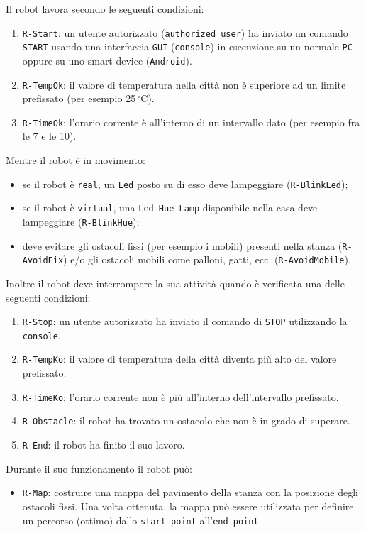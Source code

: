 \documentclass{llncs}
\newcommand{\action}[1]{\texttt{#1}\xspace}
\newcommand{\code}[1]{{\color{blue}\small{\texttt{#1}}}}
\newcommand{\fname}[1]{\small{\color{magenta}\texttt{#1}}}
\begin{document}
Il robot lavora secondo le seguenti condizioni:
\begin{enumerate}
\item \code{R-Start}: un utente autorizzato (\code{authorized user}) ha inviato un comando \action{START} usando una interfaccia \action{GUI} (\code{console}) in esecuzione su un normale \action{PC} oppure su uno smart device (\action{Android}).
\item \code{R-TempOk}: il valore di temperatura nella città non è superiore ad un limite prefissato (per esempio 25\,$^{\circ}$C).
\item \code{R-TimeOk}: l'orario corrente è all'interno di un intervallo dato (per esempio fra le 7 e le 10).
\end{enumerate}

Mentre il robot è in movimento:
\begin{itemize}
\item se il robot è \fname{real}, un \action{Led} posto su di esso deve lampeggiare (\code{R-BlinkLed});
\item se il robot è \fname{virtual}, una \action{Led Hue Lamp} disponibile nella casa deve lampeggiare (\code{R-BlinkHue});
\item deve evitare gli ostacoli fissi (per esempio i mobili) presenti nella stanza (\code{R-AvoidFix}) e/o gli ostacoli mobili come palloni, gatti, ecc. (\code{R-AvoidMobile}).
\end{itemize}

Inoltre il robot deve interrompere la sua attività quando è verificata una delle seguenti condizioni:
\begin{enumerate}
\item \code{R-Stop}: un utente autorizzato ha inviato il comando di \action{STOP} utilizzando la \code{console}.
\item \code{R-TempKo}: il valore di temperatura della città diventa più alto del valore prefissato.
\item \code{R-TimeKo}: l'orario corrente non è più all'interno dell'intervallo prefissato.
\item \code{R-Obstacle}: il robot ha trovato un ostacolo che non è in grado di superare.
\item \code{R-End}: il robot ha finito il suo lavoro.
\end{enumerate}

Durante il suo funzionamento il robot può:
\begin{itemize}
\item \code{R-Map}: costruire una mappa del pavimento della stanza con la posizione degli ostacoli fissi. Una volta ottenuta, la mappa può essere utilizzata per definire un percorso (ottimo) dallo \code{start-point} all'\code{end-point}.
\end{itemize}
\end{document}
